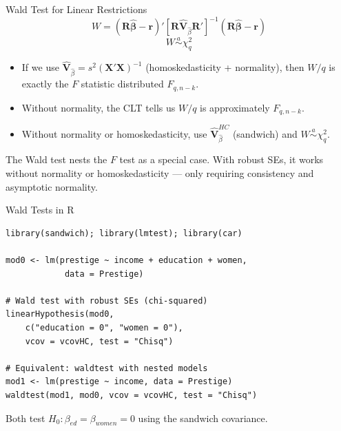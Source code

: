 \documentclass[aspectratio=169, handout, t]{beamer}
\numberwithin{equation}{section}
\begin{document}

\begin{frame}{Wald Test for Linear Restrictions}
$$W=(\bm{R}\bm{\hat{\beta}}-\bm{r})'[\bm{R}\hat{\bm{V}}_{\hat\beta}\bm{R}']^{-1}(\bm{R}\bm{\hat{\beta}}-\bm{r})$$
$$W \overset{a}{\sim} \chi^2_q$$
\begin{itemize}
\item If we use $\hat{\bm{V}}_{\hat\beta} = s^2(\bm{X}'\bm{X})^{-1}$ (homoskedasticity + normality), then $W/q$ is exactly the $F$ statistic distributed $F_{q,n-k}$.
\item Without normality, the CLT tells us $W/q$ is approximately $F_{q,n-k}$.
\item Without normality or homoskedasticity, use $\hat{\bm{V}}_{\hat\beta}^{HC}$ (sandwich) and $W \overset{a}{\sim} \chi^2_q$.
\end{itemize}

\pause

\begin{tcolorbox}[colback=blue!5, colframe=blue!50]
The Wald test nests the $F$ test as a special case. With robust SEs, it works without normality or homoskedasticity --- only requiring consistency and asymptotic normality.
\end{tcolorbox}

\end{frame}


\begin{frame}[fragile]{Wald Tests in R}
  \begin{lstlisting}
library(sandwich); library(lmtest); library(car)

mod0 <- lm(prestige ~ income + education + women,
            data = Prestige)

# Wald test with robust SEs (chi-squared)
linearHypothesis(mod0,
    c("education = 0", "women = 0"),
    vcov = vcovHC, test = "Chisq")

# Equivalent: waldtest with nested models
mod1 <- lm(prestige ~ income, data = Prestige)
waldtest(mod1, mod0, vcov = vcovHC, test = "Chisq")
\end{lstlisting}

\pause

Both test $H_0: \beta_{ed} = \beta_{women} = 0$ using the sandwich covariance.

\end{frame}
\end{document}
